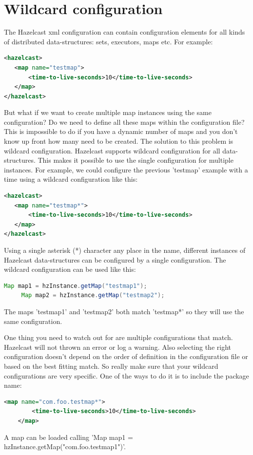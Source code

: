 \section{Wildcard configuration}
The Hazelcast xml configuration can contain configuration elements for all kinds of distributed data-structures: sets, executors, maps etc. For example:
\begin{lstlisting}[language=xml]
<hazelcast>
   <map name="testmap">
       <time-to-live-seconds>10</time-to-live-seconds>
   </map>
</hazelcast>
\end{lstlisting}
But what if we want to create multiple map instances using the same configuration? Do we need to define all these maps within the configuration file? This is impossible to do if you have a dynamic number of maps and you don't know up front how many need to be created. The solution to this problem is wildcard configuration. Hazelcast supports wildcard configuration for all data-structures. This makes it possible to use the single configuration for multiple instances. For example, we could configure the previous 'testmap' example with a time using a wildcard configuration like this:
\begin{lstlisting}[language=xml]
<hazelcast>
   <map name="testmap*">
       <time-to-live-seconds>10</time-to-live-seconds>
   </map>
</hazelcast>
\end{lstlisting}
Using a single asterisk (*) character any place in the name, different instances of Hazelcast data-structures can be configured by a single configuration. The wildcard configuration can be used like this:
\begin{lstlisting}[language=java]
     Map map1 = hzInstance.getMap("testmap1");
     Map map2 = hzInstance.getMap("testmap2");
\end{lstlisting}
The maps 'testmap1' and 'testmap2' both match 'testmap*' so they will use the same configuration.

One thing you need to watch out for are multiple configurations that match. Hazelcast will not thrown an error or log a warning. Also selecting the right configuration doesn't depend on the order of definition in the configuration file or based on the best fitting match. So really make sure that your wildcard configurations are very specific. One of the ways to do it is to include the package name:
\begin{lstlisting}[language=xml]
    <map name="com.foo.testmap*">
        <time-to-live-seconds>10</time-to-live-seconds>
    </map>
\end{lstlisting}
A map can be loaded calling 'Map map1 = hzInstance.getMap("com.foo.testmap1")'. 

